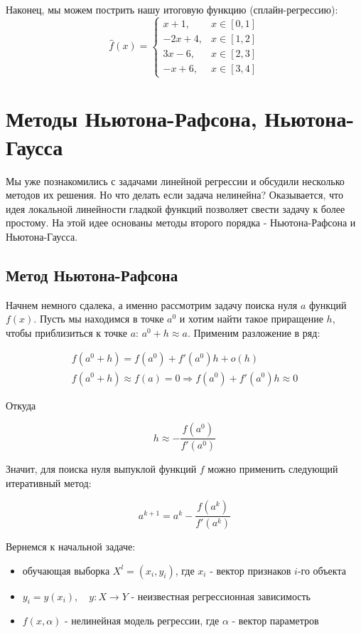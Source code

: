 {Наконец, мы можем пострить нашу итоговую функцию (сплайн-регрессию):
\[
    \hat{f}(x) =
    \begin{cases}
        x + 1,   & x \in [0, 1] \\
        -2x + 4, & x \in [1, 2] \\
        3x - 6,  & x \in [2, 3] \\
        -x + 6,  & x \in [3, 4]
    \end{cases}
\]






\section*{Методы Ньютона-Рафсона, Ньютона-Гаусса}

Мы уже познакомились с задачами линейной регрессии и обсудили несколько методов их решения. Но что делать если задача нелинейна? Оказывается, что идея локальной линейности гладкой функций позволяет свести задачу к более простому. На этой идее основаны методы второго порядка - Ньютона-Рафсона и Ньютона-Гаусса.

\subsection*{Метод Ньютона-Рафсона}

Начнем немного сдалека, а именно рассмотрим задачу поиска нуля $a$ функций $f(x)$. Пусть мы находимся в точке $a^{0}$ и хотим найти такое приращение $h$, чтобы приблизиться к точке $a$: $a^{0} + h \approx a$. Применим разложение в ряд:

\begin{gather*}
    f(a^{0} + h) = f(a^{0}) + f'(a^{0})h + o(h)\\[1em]
    f(a^{0} + h) \approx f(a) = 0 \Rightarrow f(a^{0}) + f'(a^{0})h \approx 0
\end{gather*}

Откуда

\[
    h \approx - \frac{f(a^{0})}{f'(a^{0})}
\]

Значит, для поиска нуля выпуклой функций \( f \) можно применить следующий итеративный метод:

\[
    a^{k + 1} = a^{k} - \frac{f(a^{k})}{f'(a^k)}
\]

Вернемся к начальной задаче:

\begin{itemize}
    \item обучающая выборка \( X^{l} = (x_{i}, y_{i}) \), где \( x_{i} \) - вектор признаков \( i \)-го объекта
    \item \( y_{i} = y(x_{i}),\quad y: X \to Y \) - неизвестная регрессионная зависимость
    \item \( f(x, \alpha) \) - нелинейная модель регрессии, где \( \alpha \) - вектор параметров
\end{itemize}

}
